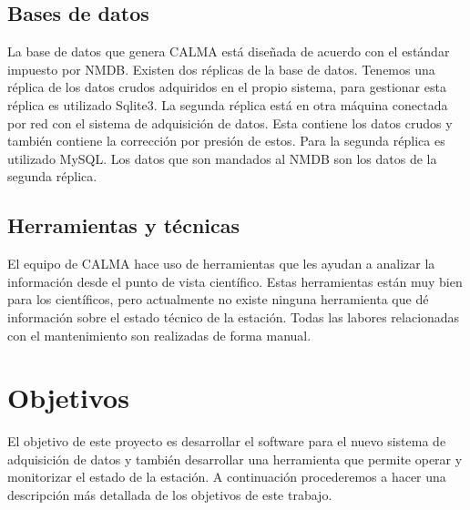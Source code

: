 	\subsection{Bases de datos}
		La base de datos que genera CALMA está diseñada de acuerdo con el estándar impuesto por NMDB. Existen dos réplicas de la
		base de datos. Tenemos una réplica de los datos crudos adquiridos en el propio sistema, para gestionar esta réplica es utilizado
		Sqlite3. La segunda réplica está en otra máquina conectada por red con el sistema de adquisición de datos. Esta contiene los datos
		crudos y también contiene la corrección por presión de estos. Para la segunda réplica es utilizado MySQL. Los datos que son mandados
		al NMDB son los datos de la segunda réplica.
	\subsection{Herramientas y técnicas}
		El equipo de CALMA hace uso de herramientas que les ayudan a analizar la información desde el punto de vista científico.
		Estas herramientas están muy bien para los científicos, pero actualmente no existe ninguna herramienta que dé información sobre el
		estado técnico de la estación. Todas las labores relacionadas con el mantenimiento son realizadas de forma manual.

\section{Objetivos}
	El objetivo de este proyecto es desarrollar el software para el nuevo sistema de adquisición de datos y también desarrollar una herramienta
	que permite operar y monitorizar el estado de la estación. A continuación procederemos a hacer una descripción más detallada de los objetivos
	de este trabajo.  
